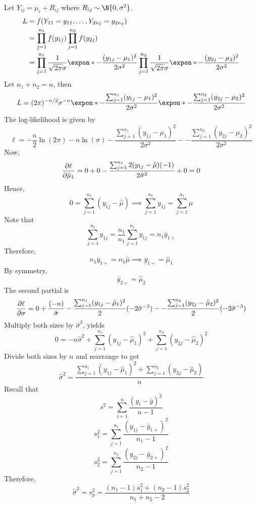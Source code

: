 \begin{Example}{}{}
    Let $ Y_{ij}=\mu_i+R_{ij} $ where $ R_{ij}\sim\N{0,\sigma^2} $.
    \begin{align*}
        L & =f(Y_{11}=y_{11},\ldots,Y_{2n_2}=y_{2n_2})                                                \\
          & =\prod_{j=1}^{n_1}f(y_{1j})\prod_{j=1}^{n_2}f(y_{2j})                                     \\
          & =\prod_{j=1}^{n_1}\frac{1}{\sqrt{2\pi}\sigma}\expon*{-\frac{(y_{1j}-\mu_1)^2}{2\sigma^2}}
        \prod_{j=1}^{n_2}\frac{1}{\sqrt{2\pi}\sigma}\expon*{-\frac{(y_{2j}-\mu_2)^2}{2\sigma^2}}
    \end{align*}
    Let $ n_1+n_2=n $, then
    \[ L=(2\pi)^{-n/2}\sigma^{-n}\expon*{-\frac{\sum_{j=1}^{n_1}(y_{1j}-\mu_1)^2}{2\sigma^2}}
        \expon*{-\frac{\sum_{j=1}^{n_2}(y_{2j}-\mu_2)^2}{2\sigma^2}} \]
    The log-likelihood is given by
    \[ \ell=-\frac{n}{2}\ln(2\pi)-n\ln(\sigma)-\frac{\sum_{j=1}^{n_1} (y_{1j}-\mu_1)^2}{2\sigma^2}-
        -\frac{\sum_{j=1}^{n_2}(y_{2j}-\mu_2)^2}{2\sigma^2} \]
    Now,
    \[ \pdv{\ell}{\hat{\mu}_1}=0+0-\frac{\sum_{j=1}^{n_1}2(y_{1j}-\hat{\mu})(-1) }{2\hat{\sigma}^2}+0=0 \]
    Hence,
    \[ 0=\sum_{j=1}^{n_1}(y_{1j}-\hat{\mu})\implies \sum_{j=1}^{n_1}y_{1j}=\sum_{j=1}^{n_1}\hat{\mu} \]
    Note that
    \[ \sum_{j=1}^{n_1}y_{1j}=\frac{n_1}{n_1} \sum_{j=1}^{n_1} y_{1j}=n_1\bar{y}_{1+}  \]
    Therefore,
    \[ n_1\bar{y}_{1+}=n_1\hat{\mu}\implies \bar{y}_{1+}=\hat{\mu}_1 \]
    By symmetry,
    \[ \bar{y}_{2+}=\hat{\mu}_2 \]
    The second partial is
    \[ \pdv{\ell}{\sigma}=0+\frac{(-n)}{\hat{\sigma}}-\frac{\sum_{j=1}^{n_1} (y_{1j}-\hat{\mu}_1)^2}{2}(-2\hat{\sigma}^{-3})-
        -\frac{\sum_{j=1}^{n_2}(y_{2j}-\hat{\mu}_2)^2}{2}(-2\hat{\sigma}^{-3})
    \]
    Multiply both sizes by $ \hat{\sigma}^3 $, yields
    \[ 0=-n\hat{\sigma}^2+\sum_{j=1}^{n_1} (y_{1j}-\hat{\mu}_1)^2
        +\sum_{j=1}^{n_2}(y_{2j}-\hat{\mu}_2)^2 \]
    Divide both sizes by $ n $ and rearrange to get
    \[ \hat{\sigma}^2=\frac{\sum_{j=1}^{n_1} (y_{1j}-\hat{\mu}_1)^2+\sum_{j=1}^{n_{2}}(y_{2j}-\hat{\mu}_2) }{n} \]
    Recall that
    \[ s^2=\sum_{i=1}^{n} \frac{(y_i-\bar{y})^2}{n-1}  \]
    \[ s_1^2=\sum_{j=1}^{n_1}\frac{(y_{1j}-\bar{y}_{1+})^2}{n_1-1} \]
    \[ s_2^2=\sum_{j=1}^{n_2}\frac{(y_{2j}-\bar{y}_{2+})^2}{n_2-1} \]
    Therefore,
    \[ \hat{\sigma}^2=s_p^2=\frac{(n_1-1)s_1^2+(n_2-1)s_2^2}{n_1+n_2-2}  \]
\end{Example}
